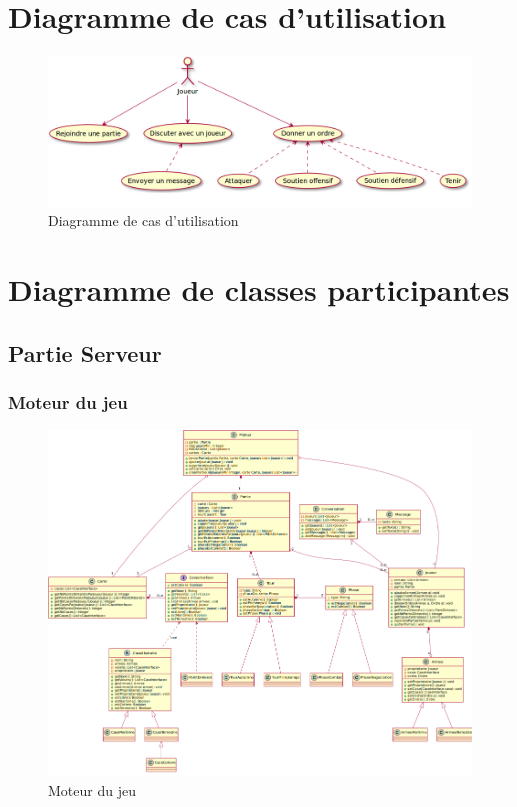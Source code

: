 \section{Diagramme de cas d'utilisation}
	\begin{figure}[!h]
		\centering
		\includegraphics[scale=0.4]{images/UseCase.png}
		\caption{Diagramme de cas d'utilisation}
	\end{figure}

\newpage

\section{Diagramme de classes participantes}
	\subsection{Partie Serveur}
		\subsubsection{Moteur du jeu}
			\begin{figure}[!h]
				\centering
				\includegraphics[scale=0.6,angle=90]{images/DCP1.png}
				\caption{Moteur du jeu}
			\end{figure}
		\newpage
